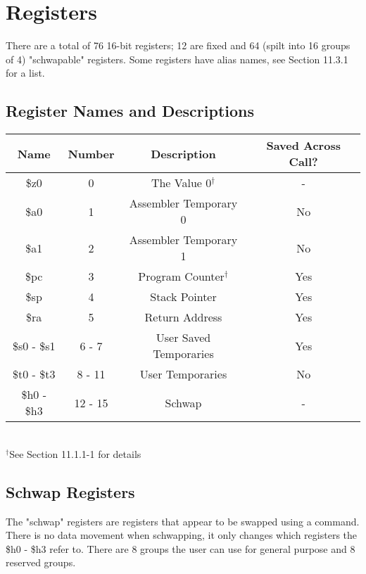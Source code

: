 \section{Registers}
	There are a total of 76 16-bit registers; 12 are fixed and 64 (spilt into 16 groups of 4) "schwapable" registers.  Some registers have alias names, see Section 11.3.1 for a list.
	\subsection{Register Names and Descriptions}
		\begin{center}
			\begin{tabular}{| c | c | c | c |} \hline
				Name        & Number  & Description            & Saved Across Call? \\ \hline
				\$z0        & 0       & The Value 0$^\dagger$  & -   \\ \hline
				\$a0        & 1       & Assembler Temporary 0  & No  \\ \hline
				\$a1        & 2       & Assembler Temporary 1  & No  \\ \hline
				\$pc        & 3       & Program Counter$^\dagger$&Yes\\ \hline
				\$sp        & 4       & Stack Pointer          & Yes \\ \hline
				\$ra        & 5       & Return Address         & Yes \\ \hline
				\$s0 - \$s1 & 6 - 7   & User Saved Temporaries & Yes \\ \hline
				\$t0 - \$t3 & 8 - 11  & User Temporaries       & No  \\ \hline
				\$h0 - \$h3 & 12 - 15 & Schwap                 & -   \\ \hline
			\end{tabular} \\
			$^\dagger$See Section 11.1.1-1 for details
		\end{center}
	\subsection{Schwap Registers}
		The "schwap" registers are registers that appear to be swapped using a command.  There is no data movement when schwapping, it only changes which registers the \$h0 - \$h3 refer to.  There are 8 groups the user can use for general purpose and 8 reserved groups.
